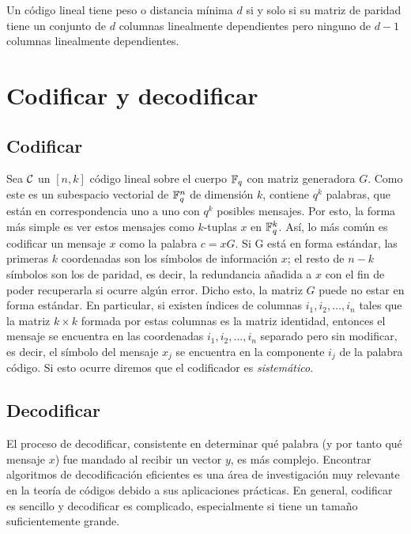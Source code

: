 \begin{corollary}
\label{cor:distance_parity_matrix}
Un código lineal tiene peso o distancia mínima \(d\) si y solo si su matriz de paridad tiene un conjunto de \(d\) columnas linealmente dependientes pero ninguno de \(d-1\) columnas linealmente dependientes.
\end{corollary}

\section{Codificar y decodificar}

\subsection{Codificar}%
Sea \(\mathcal{C}\) un \([n,k]\) código lineal sobre el cuerpo \(\mathbb{F}_q\) con matriz generadora \(G\). Como este es un subespacio vectorial de \(\mathbb{F}_q^n\) de dimensión \(k\), contiene \(q^k\) palabras, que están en correspondencia uno a uno con \(q^k\) posibles mensajes. Por esto, la forma más simple es ver estos mensajes como \(k\)-tuplas \(x\) en \(\mathbb{F}_q^k\). Así, lo más común es codificar un mensaje \(x\) como la palabra \(c = xG\). Si G está en forma estándar, las primeras \(k\) coordenadas son los símbolos de información \(x\); el resto de \(n-k\) símbolos son los de paridad, es decir, la redundancia añadida a \(x\) con el fin de poder recuperarla si ocurre algún error. Dicho esto, la matriz \(G\) puede no estar en forma estándar. En particular, si existen índices de columnas \(i_1, i_2, \dots, i_n \) tales que la matriz \(k \times k\) formada por estas columnas es la matriz identidad, entonces el mensaje se encuentra en las coordenadas \(i_1, i_2, \dots, i_n \) separado pero sin modificar, es decir, el símbolo del mensaje \(x_j\) se encuentra en la componente \(i_j\) de la palabra código. Si esto ocurre diremos que el codificador es \textit{sistemático}.

\subsection{Decodificar}%
\label{sub:decodificar_y_el_teorema_de_shannon}

El proceso de decodificar, consistente en determinar qué palabra (y por tanto qué mensaje \(x\)) fue mandado al recibir un vector \(y\), es más complejo. Encontrar algoritmos de decodificación eficientes es una área de investigación muy relevante en la teoría de códigos debido a sus aplicaciones prácticas. En general, codificar es sencillo y decodificar es complicado, especialmente si tiene un tamaño suficientemente grande.


